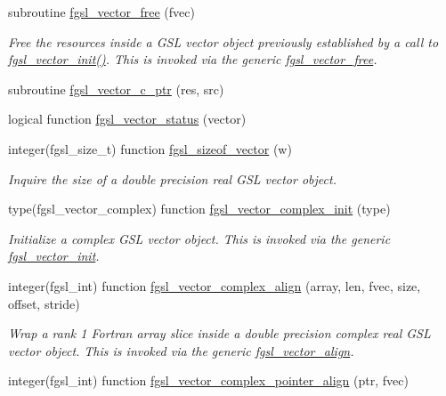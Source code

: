 \begin{DoxyCompactItemize}
subroutine \hyperlink{array_8finc_a900770fc4f4831abf928959477ba663f}{fgsl\+\_\+vector\+\_\+free} (fvec)
\begin{DoxyCompactList}\small\item\em Free the resources inside a G\+S\+L vector object previously established by a call to \hyperlink{array_8finc_a0b6fe341146fbb3dfb27386e73c5d042}{fgsl\+\_\+vector\+\_\+init()}. This is invoked via the generic \hyperlink{interfacefgsl__vector__free}{fgsl\+\_\+vector\+\_\+free}. \end{DoxyCompactList}\item 
subroutine \hyperlink{array_8finc_a8e80ad86d191ff87ae459b78822d468d}{fgsl\+\_\+vector\+\_\+c\+\_\+ptr} (res, src)
\item 
logical function \hyperlink{array_8finc_a804073922a322c29cd5be43410581ba4}{fgsl\+\_\+vector\+\_\+status} (vector)
\item 
integer(fgsl\+\_\+size\+\_\+t) function \hyperlink{array_8finc_a35a09f656acc547c7613501889490fc0}{fgsl\+\_\+sizeof\+\_\+vector} (w)
\begin{DoxyCompactList}\small\item\em Inquire the size of a double precision real G\+S\+L vector object. \end{DoxyCompactList}\item 
type(fgsl\+\_\+vector\+\_\+complex) function \hyperlink{array_8finc_a71c83c0b1de4b3965b6b8d6efb28cf13}{fgsl\+\_\+vector\+\_\+complex\+\_\+init} (type)
\begin{DoxyCompactList}\small\item\em Initialize a complex G\+S\+L vector object. This is invoked via the generic \hyperlink{interfacefgsl__vector__init}{fgsl\+\_\+vector\+\_\+init}. \end{DoxyCompactList}\item 
integer(fgsl\+\_\+int) function \hyperlink{array_8finc_ad91319661b892e978cfc3da52b15b500}{fgsl\+\_\+vector\+\_\+complex\+\_\+align} (array, len, fvec, size, offset, stride)
\begin{DoxyCompactList}\small\item\em Wrap a rank 1 Fortran array slice inside a double precision complex real G\+S\+L vector object. This is invoked via the generic \hyperlink{interfacefgsl__vector__align}{fgsl\+\_\+vector\+\_\+align}. \end{DoxyCompactList}\item 
integer(fgsl\+\_\+int) function \hyperlink{array_8finc_a0299f0feb175c085408bffdc001cb680}{fgsl\+\_\+vector\+\_\+complex\+\_\+pointer\+\_\+align} (ptr, fvec)

\end{DoxyCompactItemize}
